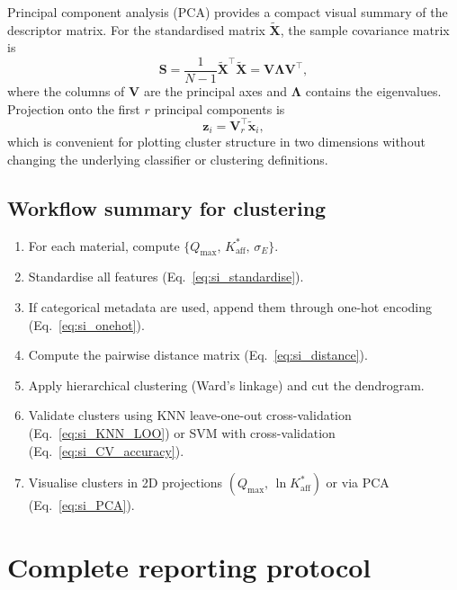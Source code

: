 \documentclass[journal=aamick,manuscript=article]{achemso}
\begin{document}
Principal component analysis (PCA) provides a compact visual summary of
the descriptor matrix. For the standardised matrix
$\tilde{\mathbf{X}}$, the sample covariance matrix is
\begin{equation}
	\mathbf{S}
	=
	\frac{1}{N-1}\tilde{\mathbf{X}}^\top \tilde{\mathbf{X}}
	=
	\mathbf{V}\boldsymbol{\Lambda}\mathbf{V}^\top,
	\label{eq:si_PCA_cov}
\end{equation}
where the columns of $\mathbf{V}$ are the principal axes and
$\boldsymbol{\Lambda}$ contains the eigenvalues. Projection onto the
first $r$ principal components is
\begin{equation}
	\mathbf{z}_i = \mathbf{V}_r^\top \tilde{\mathbf{x}}_i,
	\label{eq:si_PCA}
\end{equation}
which is convenient for plotting cluster structure in two dimensions
without changing the underlying classifier or clustering definitions.

\subsection{Workflow summary for clustering}
\label{sec:si_clustering_workflow}

\begin{enumerate}
	\item For each material, compute
	$\{Q_{\max},\, K_{\mathrm{aff}}^{\ast},\, \sigma_E\}$.
	\item Standardise all features (Eq.~\ref{eq:si_standardise}).
	\item If categorical metadata are used, append them through one-hot
	encoding (Eq.~\ref{eq:si_onehot}).
	\item Compute the pairwise distance matrix
	(Eq.~\ref{eq:si_distance}).
	\item Apply hierarchical clustering (Ward's linkage) and cut
	the dendrogram.
	\item Validate clusters using KNN leave-one-out cross-validation
	(Eq.~\ref{eq:si_KNN_LOO}) or SVM with cross-validation
	(Eq.~\ref{eq:si_CV_accuracy}).
	\item Visualise clusters in 2D projections
	$(Q_{\max},\, \ln K_{\mathrm{aff}}^{\ast})$ or via PCA
	(Eq.~\ref{eq:si_PCA}).
\end{enumerate}


\section{Complete reporting protocol}
\label{sec:si_protocol}
\end{document}
